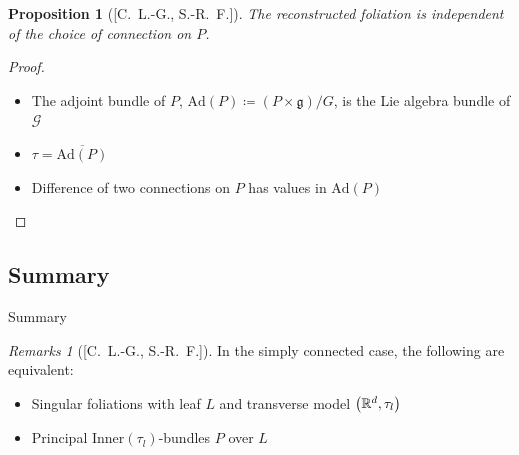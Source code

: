 \documentclass[hyperref={pdfpagelabels=false}]{beamer}
\theoremstyle{plain}
\newtheorem{proposition}[theorem]{Proposition}
\theoremstyle{remark}
\newtheorem*{remark}{Remarks}
\begin{document}
{{\begin{frame}
\begin{proposition}[{[C.\ L.-G., S.-R.\ F.]}]
The reconstructed foliation is independent of the choice of connection on $P$.
\end{proposition}
\pause
\begin{proof}
\begin{itemize}
	\item The adjoint bundle of $P$, $\mathup{Ad}(P) \coloneqq (P \times \mathfrak{g})/G$, is the Lie algebra bundle of $\mathcal{G}$
	\item $\tau = \overline{\mathup{Ad}(P)}$
	\item Difference of two connections on $P$ has values in $\mathup{Ad}(P)$
\end{itemize}
\end{proof}
\end{frame}

\subsection{Summary}

\begin{frame}{Summary}
\begin{remark}[{[C.\ L.-G., S.-R.\ F.]}]
In the simply connected case, the following are equivalent:
\begin{itemize}
	\item Singular foliations with leaf $L$ and transverse model $\mleft(\mathbb{R}^d, \tau_l\mright)$
	\item Principal $\mathrm{Inner}(\tau_l)$-bundles $P$ over $L$
\end{itemize}
\end{remark}


\end{frame}}}
\end{document}
